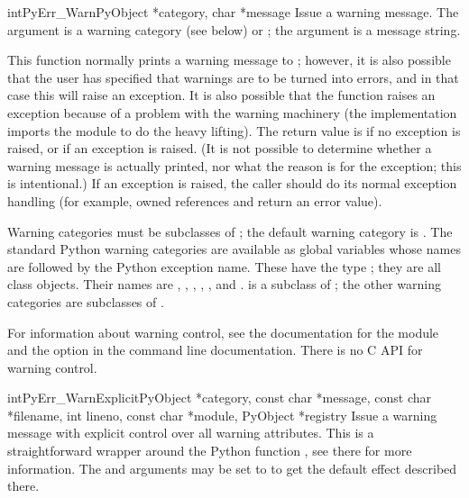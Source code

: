 \begin{cfuncdesc}{int}{PyErr_Warn}{PyObject *category, char *message}
  Issue a warning message.  The  argument is a warning
  category (see below) or \NULL; the  argument is a
  message string.

  This function normally prints a warning message to ;
  however, it is also possible that the user has specified that
  warnings are to be turned into errors, and in that case this will
  raise an exception.  It is also possible that the function raises an
  exception because of a problem with the warning machinery (the
  implementation imports the  module to do the heavy
  lifting).  The return value is  if no exception is raised,
  or  if an exception is raised.  (It is not possible to
  determine whether a warning message is actually printed, nor what
  the reason is for the exception; this is intentional.)  If an
  exception is raised, the caller should do its normal exception
  handling (for example,  owned references and
  return an error value).

  Warning categories must be subclasses of ; the
  default warning category is .  The standard
  Python warning categories are available as global variables whose
  names are  followed by the Python exception name.
  These have the type ; they are all class objects.
  Their names are , ,
  , ,
  , and .
   is a subclass of ; the
  other warning categories are subclasses of .

  For information about warning control, see the documentation for the
   module and the  option in the
  command line documentation.  There is no C API for warning control.
\end{cfuncdesc}

\begin{cfuncdesc}{int}{PyErr_WarnExplicit}{PyObject *category,
                const char *message, const char *filename, int lineno,
                const char *module, PyObject *registry}
  Issue a warning message with explicit control over all warning
  attributes.  This is a straightforward wrapper around the Python
  function , see there for more
  information.  The  and  arguments may be
  set to \NULL{} to get the default effect described there.
\end{cfuncdesc}

